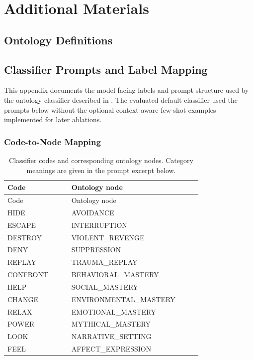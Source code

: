 
\chapter{Additional Materials}

\section{Ontology Definitions}


\section{Classifier Prompts and Label Mapping}
\label{app:classifier-prompts}

This appendix documents the model-facing labels and prompt structure used by the ontology classifier described in . The evaluated default classifier used the prompts below without the optional context-aware few-shot examples implemented for later ablations.

\subsection{Code-to-Node Mapping}

\begin{longtable}{>{\ttfamily}p{0.28\linewidth}>{\ttfamily}p{0.58\linewidth}}
  \caption{Classifier codes and corresponding ontology nodes. Category meanings are given in the prompt excerpt below.}
  \label{tab:classifier-code-map}\\
  \toprule
  Code & Ontology node \\
  \midrule
  \endfirsthead
  \toprule
  Code & Ontology node \\
  \midrule
  \endhead
  HIDE & AVOIDANCE \\
  ESCAPE & INTERRUPTION \\
  DESTROY & VIOLENT\_REVENGE \\
  DENY & SUPPRESSION \\
  REPLAY & TRAUMA\_REPLAY \\
  CONFRONT & BEHAVIORAL\_MASTERY \\
  HELP & SOCIAL\_MASTERY \\
  CHANGE & ENVIRONMENTAL\_MASTERY \\
  RELAX & EMOTIONAL\_MASTERY \\
  POWER & MYTHICAL\_MASTERY \\
  LOOK & NARRATIVE\_SETTING \\
  FEEL & AFFECT\_EXPRESSION \\
  \bottomrule
\end{longtable}

